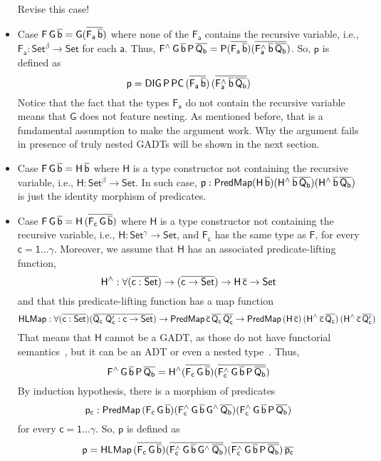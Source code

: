 \documentclass[acmsmall,screen,review,anonymous]{acmart}
\theoremstyle{definition}
\begin{document}
\begin{itemize}
{\color{blue} Revise this case!}
\item Case $\mathsf{F\,G\,\overline{b} = G(\overline{F_a\,\overline{b}})}$
where none of the $\mathsf{F_a}$ contains the recursive variable,
i.e., $\mathsf{F_a : Set^\beta \to Set}$
for each $\mathsf{a}$.
Thus, $\mathsf{F^{\wedge}\,G\,\overline{b}\,P\,\overline{Q_b} = P (\overline{F_a\,\overline{b}}) (\overline{F_a^{\wedge}\,\overline{b}\,\overline{Q_b}})}$.
So, $\mathsf{p}$ is defined as
\[
\mathsf{p = DIG\,P\,PC\,(\overline{F_a\,\overline{b}})\,(\overline{F_a^{\wedge}\,\overline{b}\,\overline{Q_b}})}
\]
Notice that the fact that the types $\mathsf{F_a}$ do not contain the recursive variable
means that $\mathsf{G}$ does not feature nesting.
As mentioned before, that is a fundamental assumption to make the argument work.
Why the argument fails in presence of truly nested GADTs will be shown in the next section.
\item Case $\mathsf{F\,G\,\overline{b} = H\,\overline{b}}$
where $\mathsf{H}$ is a type constructor not containing the recursive variable,
i.e., $\mathsf{H : Set^\beta \to Set}$.
In such case, $\mathsf{p : PredMap (H\,\overline{b}) (H^{\wedge}\,\overline{b}\,\overline{Q_b}) (H^{\wedge}\,\overline{b}\,\overline{Q_b})}$
is just the identity morphism of predicates.
\item Case $\mathsf{F\,G\,\overline{b} = H\,(\overline{F_c\,G\,\overline{b}})}$
where $\mathsf{H}$ is a type constructor not containing the recursive variable,
i.e., $\mathsf{H : Set^\gamma \to Set}$,
and $\mathsf{F_c}$ has the same type as $\mathsf{F}$, for every $\mathsf{c = 1 \dots \gamma}$.
Moreover, we assume that $\mathsf{H}$ has an associated predicate-lifting function,
\[
\mathsf{H^{\wedge} : \forall (\overline{c : Set}) \to (\overline{c \to Set}) \to H\,\overline{c} \to Set}
\]
and that this predicate-lifting function has a map function
\[
\mathsf{HLMap : \forall (\overline{c : Set}) (\overline{Q_c\;Q_c' : c \to Set}) \to PredMap\,\overline{c}\,\overline{Q_c}\,\overline{Q_c'}
\to PredMap\,(H\,\overline{c})\,(H^{\wedge}\,\overline{c}\,\overline{Q_c})\,(H^{\wedge}\,\overline{c}\,\overline{Q_c'})}
\]
That means that $\mathsf{H}$ cannot be a GADT, as those do not have functorial semantics~\cite{HaskellPaper},
but it can be an ADT or even a nested type~\cite{jp19,jgj21}.
Thus,
\[
\mathsf{F^{\wedge}\,G\,\overline{b}\,P\,\overline{Q_b} = H^{\wedge} (\overline{F_c\,G\,\overline{b}}) (\overline{F_c^{\wedge}\,G\,\overline{b}\,P\,\overline{Q_b}})}
\]
By induction hypothesis, there is a morphism of predicates
\[
\mathsf{p_c : PredMap\,(F_c\,G\,\overline{b}) (F_c^{\wedge}\,G\,\overline{b}\,G^{\wedge}\,\overline{Q_b}) (F_c^{\wedge}\,G\,\overline{b}\,P\,\overline{Q_b})}
\]
for every $\mathsf{c = 1 \dots \gamma}$.
So, $\mathsf{p}$ is defined as
\[
\mathsf{p
= HLMap\,(\overline{F_c\,G\,\overline{b}}) (\overline{F_c^{\wedge}\,G\,\overline{b}\,G^{\wedge}\,\overline{Q_b}}) (\overline{F_c^{\wedge}\,G\,\overline{b}\,P\,\overline{Q_b}})\,\overline{p_c}}
\]

\end{itemize}
\end{document}
